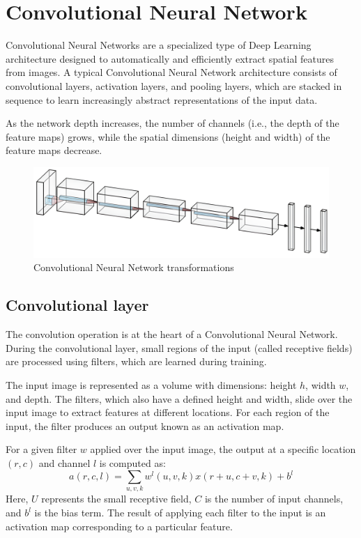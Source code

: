 \section{Convolutional Neural Network}

Convolutional Neural Networks are a specialized type of Deep Learning architecture designed to automatically and efficiently extract spatial features from images.
A typical Convolutional Neural Network architecture consists of convolutional layers, activation layers, and pooling layers, which are stacked in sequence to learn increasingly abstract representations of the input data.

As the network depth increases, the number of channels (i.e., the depth of the feature maps) grows, while the spatial dimensions (height and width) of the feature maps decrease.
\begin{figure}[H]
    \centering
    \includegraphics[width=1\linewidth]{images/cnn.png}
    \caption{Convolutional Neural Network transformations}
\end{figure}

\subsection{Convolutional layer}
The convolution operation is at the heart of a Convolutional Neural Network. 
During the convolutional layer, small regions of the input (called receptive fields) are processed using filters, which are learned during training.

The input image is represented as a volume with dimensions: height $h$, width $w$, and depth. 
The filters, which also have a defined height and width, slide over the input image to extract features at different locations. 
For each region of the input, the filter produces an output known as an activation map.

For a given filter $w$ applied over the input image, the output at a specific location $(r, c)$ and channel $l$ is computed as:
\[a(r,c,l)=\sum_{u,v,k}w^l(u,v,k)x(r+u,c+v,k)+b^l\]
Here, $U$ represents the small receptive field, $C$ is the number of input channels, and $b^l$ is the bias term. 
The result of applying each filter to the input is an activation map corresponding to a particular feature.

